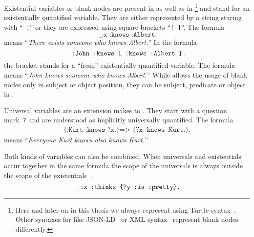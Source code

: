 Existential variables or blank nodes are present in \nthree as well as in \rdf%
\footnote{Here and later on in this thesis we always represent \rdf using Turtle-syntax~\cite{turtle}. Other syntaxes for \rdf like 
JSON-LD~\cite{jsonld} or XML syntax~\cite{rdfxml} represent blank nodes differently.}  
and stand for an existentially quantified variable. 
They are either represented by a string staring with ``\verb!_:!'' or they are expressed using square brackets ``\texttt{[~]}''. The formula
\begin{equation}
 \texttt{ \_:x :knows :Albert.}
\end{equation}
means ``\textit{There exists someone who knows Albert.}''
In the formula
\begin{equation}\label{fresh}
 \verb! :John :knows [ :knows :Albert ].!
\end{equation}
the bracket stands for a ``fresh'' existentially quantified variable. The formula means
``\textit{John knows someone who knows Albert.}''
While \rdf allows the usage of blank nodes only in subject or object position, they can be subject, predicate or object in \nthree.

Universal variables are an extension \nthree makes to \rdf. They start with a question mark~\verb!?! and are understood as implicitly universally quantified. The formula  
\begin{multline}\label{uni}
 \texttt{\{:Kurt :knows ?x.\} => }%
 \texttt{\{?x :knows :Kurt.\}.}%
\end{multline}
 means
``\textit{Everyone Kurt knows also knows Kurt.}''
% 

Both kinds of variables can also be combined:
When universals and existentials occur together in the same formula the scope of the universals is always outside the scope of the existentials~\cite{Notation3}.
\begin{equation}\label{both}
 \verb! _:x :thinks {?y :is :pretty}.!
\end{equation}


